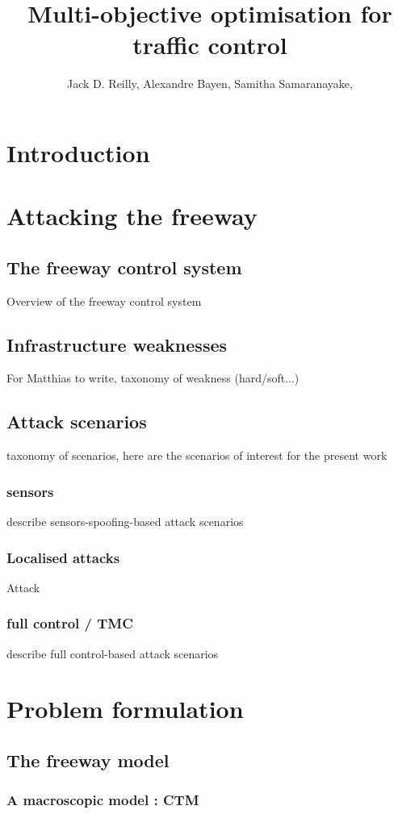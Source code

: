 \documentclass[11pt, oneside]{article}   	%
\title{Multi-objective optimisation for traffic control}
\author{Jack D. Reilly, Alexandre Bayen, Samitha Samaranayake,}
\date{}							%
\begin{document}
\maketitle
\tableofcontents

\section*{Introduction}
\section{Attacking the freeway}
	\subsection{The freeway control system}
		Overview of the freeway control system
	\subsection{Infrastructure weaknesses}
		For Matthias to write, taxonomy of weakness (hard/soft...)
	\subsection{Attack scenarios}
		taxonomy of scenarios, here are the scenarios of interest for the present work
		\subsubsection{sensors}
			describe sensors-spoofing-based attack scenarios
		\subsubsection{Localised attacks}
			Attack
		\subsubsection{full control / TMC}
			describe full control-based attack scenarios
\section{Problem formulation}			
	\subsection{The freeway model}
		\subsubsection{A macroscopic model : CTM}
\end{document}
